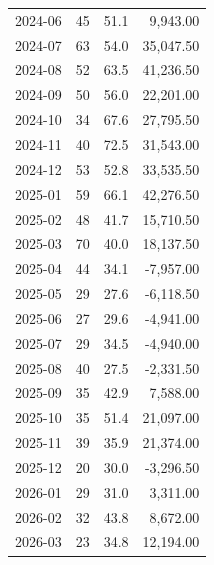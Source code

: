 \documentclass[11pt,a4paper,twoside]{article}
\begin{document}
\begin{center}
\begin{tabular}{>{\color{txtmain}}l rrr}
2024-06 & 45 & 51.1 & \textcolor{wingreen}{9,943.00} \\
2024-07 & 63 & 54.0 & \textcolor{wingreen}{35,047.50} \\
2024-08 & 52 & 63.5 & \textcolor{wingreen}{41,236.50} \\
2024-09 & 50 & 56.0 & \textcolor{wingreen}{22,201.00} \\
2024-10 & 34 & 67.6 & \textcolor{wingreen}{27,795.50} \\
2024-11 & 40 & 72.5 & \textcolor{wingreen}{31,543.00} \\
2024-12 & 53 & 52.8 & \textcolor{wingreen}{33,535.50} \\
2025-01 & 59 & 66.1 & \textcolor{wingreen}{42,276.50} \\
2025-02 & 48 & 41.7 & \textcolor{wingreen}{15,710.50} \\
2025-03 & 70 & 40.0 & \textcolor{wingreen}{18,137.50} \\
2025-04 & 44 & 34.1 & \textcolor{lossred}{-7,957.00} \\
2025-05 & 29 & 27.6 & \textcolor{lossred}{-6,118.50} \\
2025-06 & 27 & 29.6 & \textcolor{lossred}{-4,941.00} \\
2025-07 & 29 & 34.5 & \textcolor{lossred}{-4,940.00} \\
2025-08 & 40 & 27.5 & \textcolor{lossred}{-2,331.50} \\
2025-09 & 35 & 42.9 & \textcolor{wingreen}{7,588.00} \\
2025-10 & 35 & 51.4 & \textcolor{wingreen}{21,097.00} \\
2025-11 & 39 & 35.9 & \textcolor{wingreen}{21,374.00} \\
2025-12 & 20 & 30.0 & \textcolor{lossred}{-3,296.50} \\
2026-01 & 29 & 31.0 & \textcolor{wingreen}{3,311.00} \\
2026-02 & 32 & 43.8 & \textcolor{wingreen}{8,672.00} \\
2026-03 & 23 & 34.8 & \textcolor{wingreen}{12,194.00} \\
\bottomrule
\end{tabular}
\end{center}
\end{document}
